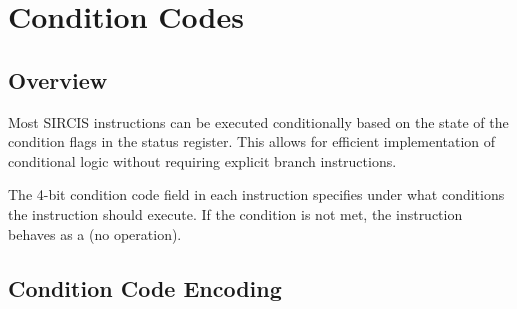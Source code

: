\chapter{Condition Codes}
\label{ch:condition-codes}

\section{Overview}

Most SIRCIS instructions can be executed conditionally based on the state of the condition flags in the status
register. This allows for efficient implementation of conditional logic without requiring explicit branch instructions.

The 4-bit condition code field in each instruction specifies under what conditions the instruction should execute. If
the condition is not met, the instruction behaves as a  (no operation).

\section{Condition Code Encoding}

